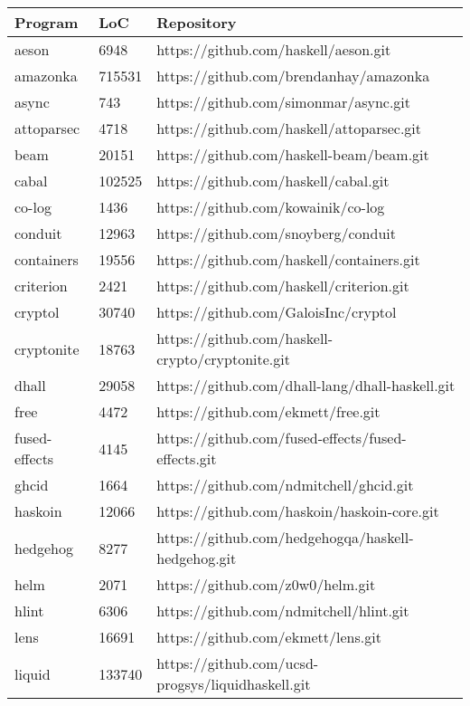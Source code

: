 \documentclass[12pt, a4paper]{article}
\begin{document}
\begin{table}[H]
    \centering
    \begin{tabular}{l l l}
        Program & LoC & Repository \\
        \hline            
        aeson & 6948 & https://github.com/haskell/aeson.git \\
        amazonka & 715531 & https://github.com/brendanhay/amazonka \\
        async & 743 & https://github.com/simonmar/async.git \\
        attoparsec & 4718 & https://github.com/haskell/attoparsec.git \\
        beam & 20151 & https://github.com/haskell-beam/beam.git \\
        cabal & 102525 & https://github.com/haskell/cabal.git \\
        co-log & 1436 & https://github.com/kowainik/co-log \\
        conduit & 12963 & https://github.com/snoyberg/conduit \\
        containers & 19556 & https://github.com/haskell/containers.git \\
        criterion & 2421 & https://github.com/haskell/criterion.git \\
        cryptol & 30740 & https://github.com/GaloisInc/cryptol \\
        cryptonite & 18763 & https://github.com/haskell-crypto/cryptonite.git \\
        dhall & 29058 & https://github.com/dhall-lang/dhall-haskell.git \\
        free & 4472 & https://github.com/ekmett/free.git \\
        fused-effects & 4145 & https://github.com/fused-effects/fused-effects.git \\
        ghcid & 1664 & https://github.com/ndmitchell/ghcid.git \\
        haskoin & 12066 & https://github.com/haskoin/haskoin-core.git \\
        hedgehog & 8277 & https://github.com/hedgehogqa/haskell-hedgehog.git \\
        helm & 2071 & https://github.com/z0w0/helm.git \\
        hlint & 6306 & https://github.com/ndmitchell/hlint.git \\
        lens & 16691 & https://github.com/ekmett/lens.git \\
        liquid & 133740 & https://github.com/ucsd-progsys/liquidhaskell.git \\

\end{tabular}
\end{table}
\end{document}
